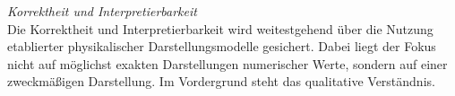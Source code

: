\textit{Korrektheit und Interpretierbarkeit}\\
Die Korrektheit und Interpretierbarkeit wird weitestgehend über die Nutzung etablierter physikalischer Darstellungsmodelle gesichert. Dabei liegt der Fokus nicht auf möglichst exakten Darstellungen numerischer Werte, sondern auf einer zweckmäßigen Darstellung. Im Vordergrund steht das qualitative Verständnis.\\

